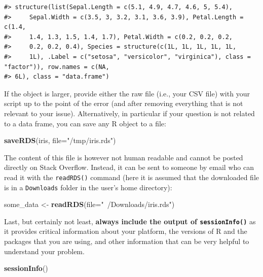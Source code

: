 \documentclass[
]{book}
\newenvironment{Shaded}{\begin{snugshade}}{\end{snugshade}}
\newcommand{\DataTypeTok}[1]{\textcolor[rgb]{0.13,0.29,0.53}{#1}}
\newcommand{\KeywordTok}[1]{\textcolor[rgb]{0.13,0.29,0.53}{\textbf{#1}}}
\newcommand{\NormalTok}[1]{#1}
\newcommand{\StringTok}[1]{\textcolor[rgb]{0.31,0.60,0.02}{#1}}
\begin{document}
\begin{verbatim}
#> structure(list(Sepal.Length = c(5.1, 4.9, 4.7, 4.6, 5, 5.4), 
#>     Sepal.Width = c(3.5, 3, 3.2, 3.1, 3.6, 3.9), Petal.Length = c(1.4, 
#>     1.4, 1.3, 1.5, 1.4, 1.7), Petal.Width = c(0.2, 0.2, 0.2, 
#>     0.2, 0.2, 0.4), Species = structure(c(1L, 1L, 1L, 1L, 1L, 
#>     1L), .Label = c("setosa", "versicolor", "virginica"), class = "factor")), row.names = c(NA, 
#> 6L), class = "data.frame")
\end{verbatim}

If the object is larger, provide either the raw file (i.e., your CSV file) with
your script up to the point of the error (and after removing everything that is
not relevant to your issue). Alternatively, in particular if your question is
not related to a data frame, you can save any R object to a file:

\begin{Shaded}
\begin{Highlighting}[]
\KeywordTok{saveRDS}\NormalTok{(iris, }\DataTypeTok{file=}\StringTok{"/tmp/iris.rds"}\NormalTok{)}
\end{Highlighting}
\end{Shaded}

The content of this file is however not human readable and cannot be posted
directly on Stack Overflow. Instead, it can be sent to someone by email who can
read it with the \texttt{readRDS()} command (here it is assumed that the downloaded
file is in a \texttt{Downloads} folder in the user's home directory):

\begin{Shaded}
\begin{Highlighting}[]
\NormalTok{some_data <-}\StringTok{ }\KeywordTok{readRDS}\NormalTok{(}\DataTypeTok{file=}\StringTok{"~/Downloads/iris.rds"}\NormalTok{)}
\end{Highlighting}
\end{Shaded}

Last, but certainly not least, \textbf{always include the output of \texttt{sessionInfo()}}
as it provides critical information about your platform, the versions of R and
the packages that you are using, and other information that can be very helpful
to understand your problem.

\begin{Shaded}
\begin{Highlighting}[]
\KeywordTok{sessionInfo}\NormalTok{()}
\end{Highlighting}
\end{Shaded}
\end{document}
